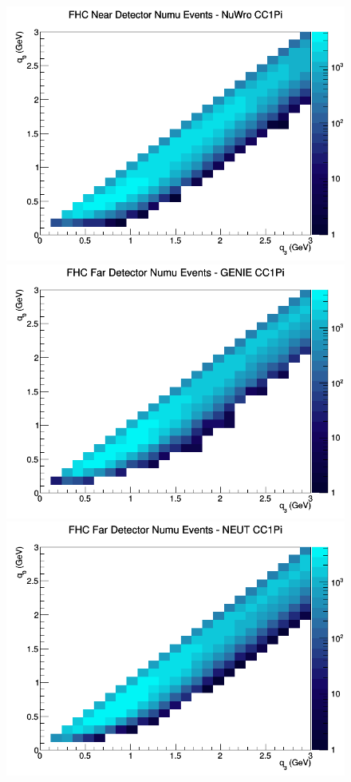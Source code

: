 \documentclass[12pt]{article}
\begin{document}
\begin{figure}[h]
\includegraphics[width=\linewidth]{q0_q3/nominal/CC1Pi_FHC_ND_numu_q3_q0_NuWro.png}
\endminipage
\newline
{}
\includegraphics[width=\linewidth]{q0_q3/nominal/CC1Pi_FHC_FD_numu_q3_q0_GENIE.png}
\endminipage
{}
\includegraphics[width=\linewidth]{q0_q3/nominal/CC1Pi_FHC_FD_numu_q3_q0_NEUT.png}

\end{figure}
\end{document}
